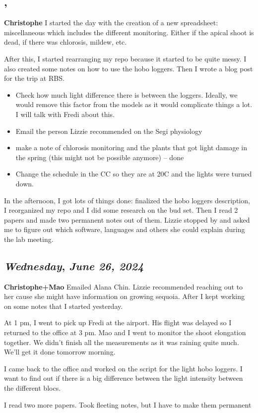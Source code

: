 \begin {itemize}
\subsection*{\weekday, \day}
\textbf {Christophe}
I started the day with the creation of a new spreadsheet: miscellaneous which includes the different monitoring. Either if the apical shoot is dead, if there was chlorosis, mildew, etc. 
\par After this, I started rearranging my repo because it started to be quite messy. I also created some notes on how to use the hobo loggers. Then I wrote a blog post for the trip at RBS.
\begin {itemize}
	\item Check how much light difference there is between the loggers. Ideally, we would remove this factor from the models as it would complicate things a lot. I will talk with Fredi about this. 
	\item Email the person Lizzie recommended on the Segi physiology
	\item make a note of chlorosis monitoring and the plants that got light damage in the spring (this might not be possible anymore) -- done 
	\item Change the schedule in the CC so they are at 20C and the lights were turned down. 
\end {itemize}

In the afternoon, I got lots of things done: finalized the hobo loggers description, I reorganized my repo and I did some research on the bud set. Then I read 2 papers and made two permanent notes out of them. Lizzie stopped by and asked me to figure out which software, languages and others she could explain during the lab meeting. 

\def\day{\textit{June 26, 2024}}
\def\weekday{\textit{Wednesday}}
\subsection*{\weekday, \day}
\textbf {Christophe+Mao}
Emailed Alana Chin. Lizzie recommended reaching out to her cause she might have information on growing sequoia. After I kept working on some notes that I started yesterday.
\par At 1 pm, I went to pick up Fredi at the airport. His flight was delayed so I returned to the office at 3 pm. Mao and I went to monitor the shoot elongation together. We didn't finish all the measurements as it was raining quite much. We'll get it done tomorrow morning. 
\par I came back to the office and worked on the script for the light hobo loggers. I want to find out if there is a big difference between the light intensity between the different blocs. 
\par I read two more papers. Took fleeting notes, but I have to make them permanent 
\def\day{\textit{June 27, 2024}}
\def\weekday{\textit{Thursday}}

\end{itemize}
